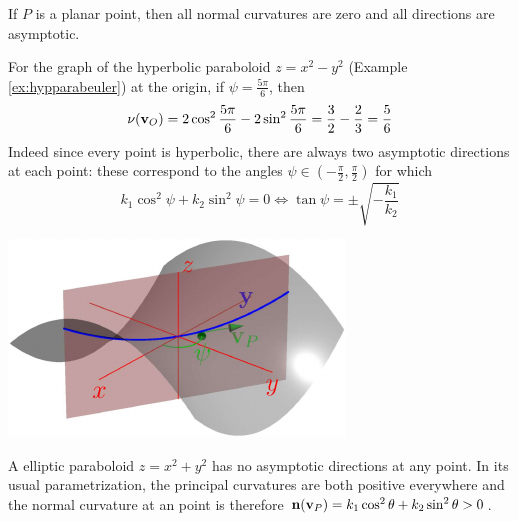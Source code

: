 

\begin{examples}{}{}
\exstart If $P$ is a planar point, then all normal curvatures are zero and all directions are asymptotic.
\begin{enumerate}\setcounter{enumi}{1}
\begin{minipage}[t]{0.6\linewidth}\vspace{0pt}
  \item For the graph of the hyperbolic paraboloid $z=x^2-y^2$ (Example \ref{ex:hypparabeuler}) at the origin, if $\psi=\frac{5\pi}6$, then
	\[
	\nu(\vv_O)=2\cos^2\frac{5\pi}6-2\sin^2\frac{5\pi}6=\frac 32-\frac 23=\frac 56 %
	\]
	Indeed since every point is hyperbolic, there are always two asymptotic directions at each point: these correspond to the angles $\psi\in(-\frac\pi 2,\frac\pi 2)$ for which 
	\[k_1\cos^2\psi+k_2\sin^2\psi=0\iff \tan\psi=\pm\sqrt{-\frac{k_1}{k_2}}\]
\end{minipage}\hfill\begin{minipage}[t]{0.39\linewidth}\vspace{0pt}
  \flushright	\flushright\href{http://www.math.uci.edu/~ndonalds/math162a/euler-setup2.html}{\includegraphics{euler-setup2}}
\end{minipage}\par

  \item A elliptic paraboloid $z=x^2+y^2$ has no asymptotic directions at any point. In its usual parametrization, the principal curvatures are both positive everywhere and  the normal curvature at an point is therefore ${\mathbf{n}}({\mathbf{v}}_P)=k_1\cos^2\theta+k_2\sin^2\theta>0$.

\end{enumerate}
\end{examples}

